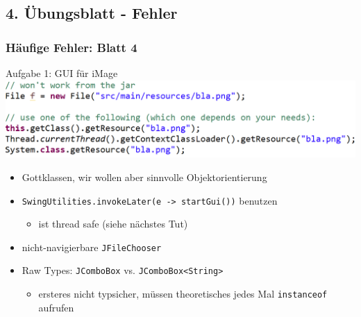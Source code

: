 \documentclass[18pt]{beamer}
\begin{document}
	\subsection{4. Übungsblatt - Fehler}
	\begin{frame}
		\frametitle{Häufige Fehler: Blatt 4}
		\begin{block}{Aufgabe 1: GUI für iMage}
			\includegraphics[scale=0.34]{./pics/tut5/file-resource.png}
			\begin{itemize}
				\pause 
				\item Gottklassen, wir wollen aber sinnvolle Objektorientierung \pause
				\item \texttt{SwingUtilities.invokeLater(e -> startGui())} benutzen
				\begin{itemize}
					\item ist thread safe (siehe nächstes Tut)
				\end{itemize} \pause
				\item nicht-navigierbare \texttt{JFileChooser} \pause
				\item Raw Types: \texttt{JComboBox} vs. \texttt{JComboBox<String>}
				\begin{itemize}
					\item ersteres nicht typsicher, müssen theoretisches jedes Mal \texttt{instanceof} aufrufen
				\end{itemize}
			\end{itemize}
		\end{block}
	\end{frame}
\end{document}
